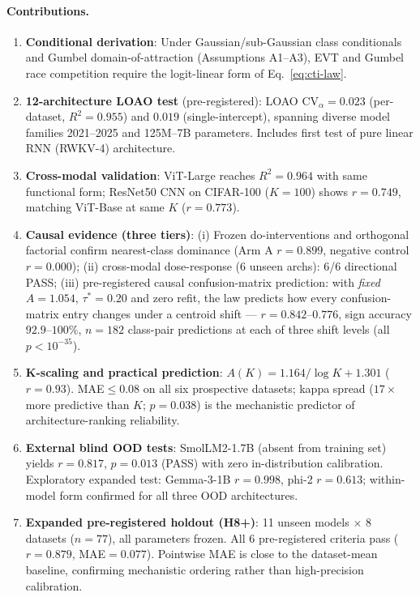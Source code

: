 \documentclass{article}
\begin{document}
\paragraph{Contributions.}
\begin{enumerate}
\item \textbf{Conditional derivation}: Under Gaussian/sub-Gaussian class conditionals and Gumbel domain-of-attraction (Assumptions A1--A3), EVT and Gumbel race competition require the logit-linear form of Eq.~\ref{eq:cti-law}.
\item \textbf{12-architecture LOAO test} (pre-registered): LOAO $\mathrm{CV}_\alpha=0.023$ (per-dataset, $R^2=0.955$) and $0.019$ (single-intercept), spanning diverse model families 2021--2025 and 125M--7B parameters. Includes first test of pure linear RNN (RWKV-4) architecture.
\item \textbf{Cross-modal validation}: ViT-Large reaches $R^2=0.964$ with same functional form; ResNet50 CNN on CIFAR-100 ($K=100$) shows $r=0.749$, matching ViT-Base at same $K$ ($r=0.773$).
\item \textbf{Causal evidence (three tiers)}: (i) Frozen do-interventions and orthogonal factorial confirm nearest-class dominance (Arm A $r=0.899$, negative control $r=0.000$); (ii) cross-modal dose-response (6 unseen archs): 6/6 directional PASS; (iii) pre-registered causal confusion-matrix prediction: with \emph{fixed} $A=1.054$, $\tau^*=0.20$ and zero refit, the law predicts how every confusion-matrix entry changes under a centroid shift --- $r=0.842$--$0.776$, sign accuracy $92.9$--$100\%$, $n=182$ class-pair predictions at each of three shift levels (all $p<10^{-35}$).
\item \textbf{K-scaling and practical prediction}: $A(K)=1.164/\log K+1.301$ ($r=0.93$). MAE$\leq$0.08 on all six prospective datasets; kappa spread ($17\times$ more predictive than $K$; $p=0.038$) is the mechanistic predictor of architecture-ranking reliability.
\item \textbf{External blind OOD tests}: SmolLM2-1.7B (absent from training set) yields $r=0.817$, $p=0.013$ (PASS) with zero in-distribution calibration. Exploratory expanded test: Gemma-3-1B $r=0.998$, phi-2 $r=0.613$; within-model form confirmed for all three OOD architectures.
\item \textbf{Expanded pre-registered holdout (H8+)}: 11 unseen models $\times$ 8 datasets ($n=77$), all parameters frozen. All 6 pre-registered criteria pass ($r=0.879$, MAE$=0.077$). Pointwise MAE is close to the dataset-mean baseline, confirming mechanistic ordering rather than high-precision calibration.

\end{enumerate}
\end{document}
